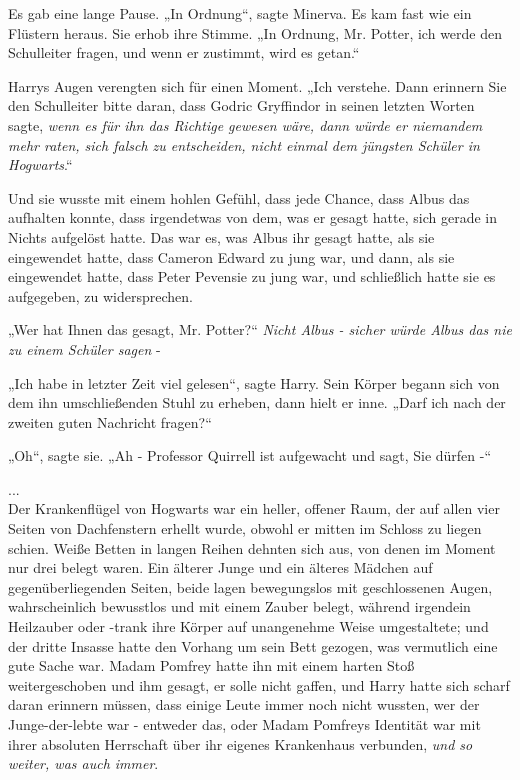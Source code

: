 {Es gab eine lange Pause. „In Ordnung“, sagte Minerva. Es kam fast wie ein Flüstern heraus. Sie erhob ihre Stimme. „In Ordnung, Mr. Potter, ich werde den Schulleiter fragen, und wenn er zustimmt, wird es getan.“

Harrys Augen verengten sich für einen Moment. „Ich verstehe. Dann erinnern Sie den Schulleiter bitte daran, dass Godric Gryffindor in seinen letzten Worten sagte, \emph{wenn es für ihn das Richtige gewesen wäre, dann würde er niemandem mehr raten, sich falsch zu entscheiden, nicht einmal dem jüngsten Schüler in Hogwarts}.“

Und sie wusste mit einem hohlen Gefühl, dass jede Chance, dass Albus das aufhalten konnte, dass irgendetwas von dem, was er gesagt hatte, sich gerade in Nichts aufgelöst hatte. Das war es, was Albus ihr gesagt hatte, als sie eingewendet hatte, dass Cameron Edward zu jung war, und dann, als sie eingewendet hatte, dass Peter Pevensie zu jung war, und schließlich hatte sie es aufgegeben, zu widersprechen.

„Wer hat Ihnen das gesagt, Mr. Potter?“ \emph{Nicht Albus - sicher würde Albus das nie zu einem Schüler sagen} -

„Ich habe in letzter Zeit viel gelesen“, sagte Harry. Sein Körper begann sich von dem ihn umschließenden Stuhl zu erheben, dann hielt er inne. „Darf ich nach der zweiten guten Nachricht fragen?“

„Oh“, sagte sie. „Ah - Professor Quirrell ist aufgewacht und sagt, Sie dürfen -“

...\\ Der Krankenflügel von Hogwarts war ein heller, offener Raum, der auf allen vier Seiten von Dachfenstern erhellt wurde, obwohl er mitten im Schloss zu liegen schien. Weiße Betten in langen Reihen dehnten sich aus, von denen im Moment nur drei belegt waren. Ein älterer Junge und ein älteres Mädchen auf gegenüberliegenden Seiten, beide lagen bewegungslos mit geschlossenen Augen, wahrscheinlich bewusstlos und mit einem Zauber belegt, während irgendein Heilzauber oder -trank ihre Körper auf unangenehme Weise umgestaltete; und der dritte Insasse hatte den Vorhang um sein Bett gezogen, was vermutlich eine gute Sache war. Madam Pomfrey hatte ihn mit einem harten Stoß weitergeschoben und ihm gesagt, er solle nicht gaffen, und Harry hatte sich scharf daran erinnern müssen, dass einige Leute immer noch nicht wussten, wer der Junge-der-lebte war - entweder das, oder Madam Pomfreys Identität war mit ihrer absoluten Herrschaft über ihr eigenes Krankenhaus verbunden, \emph{und so weiter, was auch immer}.

}
